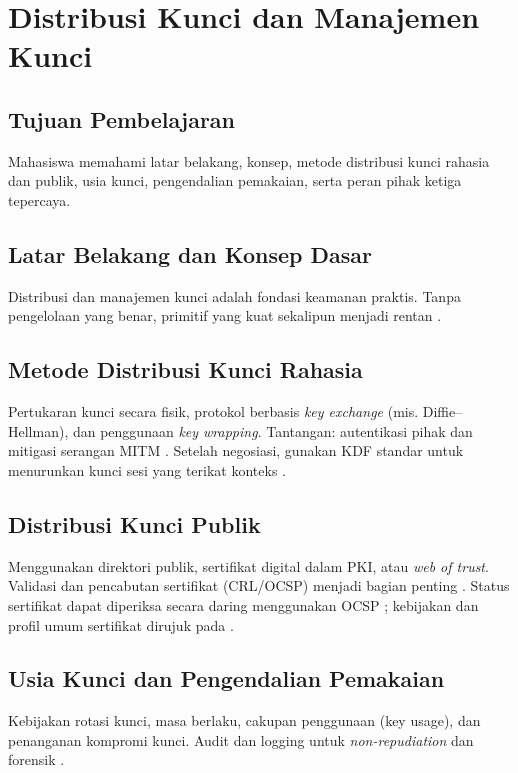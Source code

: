 \documentclass[../main.tex]{subfiles}
\begin{document}
\chapter{Distribusi Kunci dan Manajemen Kunci}

\section{Tujuan Pembelajaran}
Mahasiswa memahami latar belakang, konsep, metode distribusi kunci rahasia dan publik, usia kunci, pengendalian pemakaian, serta peran pihak ketiga tepercaya.

\section{Latar Belakang dan Konsep Dasar}
Distribusi dan manajemen kunci adalah fondasi keamanan praktis. Tanpa pengelolaan yang benar, primitif yang kuat sekalipun menjadi rentan \citep{stallings}.

\section{Metode Distribusi Kunci Rahasia}
Pertukaran kunci secara fisik, protokol berbasis \emph{key exchange} (mis. Diffie--Hellman), dan penggunaan \emph{key wrapping}. Tantangan: autentikasi pihak dan mitigasi serangan MITM \citep{diffiehellman,katzlindell}. Setelah negosiasi, gunakan KDF standar untuk menurunkan kunci sesi yang terikat konteks \citep{nist_sp_800_108,nist_sp_800_56c_r2}.

\section{Distribusi Kunci Publik}
Menggunakan direktori publik, sertifikat digital dalam PKI, atau \emph{web of trust}. Validasi dan pencabutan sertifikat (CRL/OCSP) menjadi bagian penting \citep{stallings}. Status sertifikat dapat diperiksa secara daring menggunakan OCSP \citep{rfc6960}; kebijakan dan profil umum sertifikat dirujuk pada \citep{rfc5280}.

\section{Usia Kunci dan Pengendalian Pemakaian}
Kebijakan rotasi kunci, masa berlaku, cakupan penggunaan (key usage), dan penanganan kompromi kunci. Audit dan logging untuk \emph{non-repudiation} dan forensik \citep{menezes}.
\end{document}
